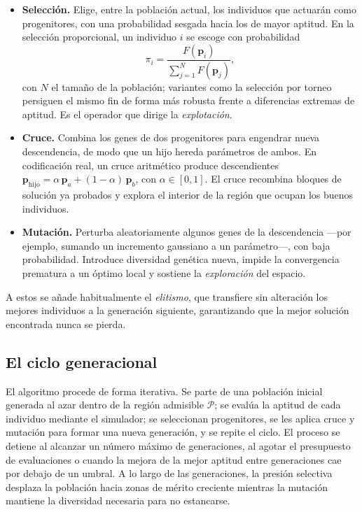 \begin{itemize}
    \item \textbf{Selección.} Elige, entre la población actual, los individuos que
    actuarán como progenitores, con una probabilidad sesgada hacia los de mayor
    aptitud. En la selección proporcional, un individuo $i$ se escoge con
    probabilidad
    \begin{equation}
        \pi_i = \frac{F(\mathbf{p}_i)}{\sum_{j=1}^{N} F(\mathbf{p}_j)},
        \label{eq:ga_seleccion}
    \end{equation}
    con $N$ el tamaño de la población; variantes como la selección por torneo
    persiguen el mismo fin de forma más robusta frente a diferencias extremas de
    aptitud. Es el operador que dirige la \emph{explotación}.

    \item \textbf{Cruce.} Combina los genes de dos progenitores para engendrar nueva
    descendencia, de modo que un hijo hereda parámetros de ambos. En codificación
    real, un cruce aritmético produce descendientes
    $\mathbf{p}_{\text{hijo}} = \alpha\,\mathbf{p}_a + (1-\alpha)\,\mathbf{p}_b$,
    con $\alpha\in[0,1]$. El cruce recombina bloques de solución ya probados y
    explora el interior de la región que ocupan los buenos individuos.

    \item \textbf{Mutación.} Perturba aleatoriamente algunos genes de la
    descendencia —por ejemplo, sumando un incremento gaussiano a un parámetro—, con
    baja probabilidad. Introduce diversidad genética nueva, impide la convergencia
    prematura a un óptimo local y sostiene la \emph{exploración} del espacio.
\end{itemize}

A estos se añade habitualmente el \emph{elitismo}, que transfiere sin alteración los
mejores individuos a la generación siguiente, garantizando que la mejor solución
encontrada nunca se pierda.

\subsection{El ciclo generacional}
\label{sec:ga_ciclo}

El algoritmo procede de forma iterativa. Se parte de una población inicial generada
al azar dentro de la región admisible $\mathcal{P}$; se evalúa la aptitud de cada
individuo mediante el simulador; se seleccionan progenitores, se les aplica cruce y
mutación para formar una nueva generación, y se repite el ciclo. El proceso se
detiene al alcanzar un número máximo de generaciones, al agotar el presupuesto de
evaluaciones o cuando la mejora de la mejor aptitud entre generaciones cae por
debajo de un umbral. A lo largo de las generaciones, la presión selectiva desplaza
la población hacia zonas de mérito creciente mientras la mutación mantiene la
diversidad necesaria para no estancarse.

